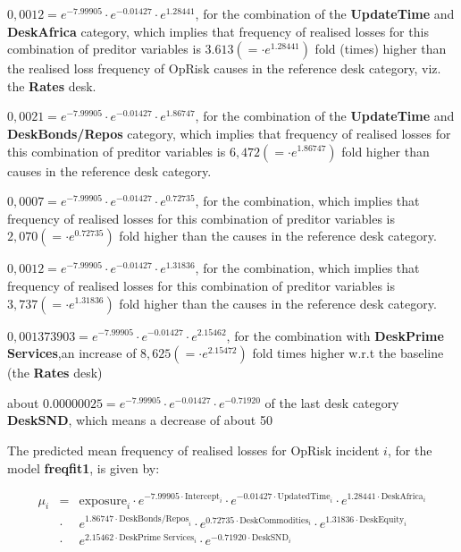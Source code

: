 \documentclass[]{article}
\begin{document}
\begin{list}{*}{}
\item $0,0012 = e^{-7.99905}\cdot e^{-0.01427}\cdot e^{1.28441}$, for the combination of the \textbf{UpdateTime} and \textbf{DeskAfrica} category, which implies that frequency of realised losses for this combination of preditor variables is $3.613 (=\cdot e^{1.28441})$ fold (times) higher than the realised loss frequency of OpRisk causes in the reference desk category, viz. the \textbf{Rates} desk. 
\item $0,0021 = e^{-7.99905}\cdot e^{-0.01427}\cdot e^{1.86747}$, for the combination of the \textbf{UpdateTime} and \textbf{DeskBonds/Repos} category, which implies that frequency of realised losses for this combination of preditor variables is $6,472(=\cdot e^{1.86747})$ fold higher than causes in the reference desk category.
\item $0,0007 = e^{-7.99905}\cdot e^{-0.01427}\cdot e^{0.72735}$, for the combination, which implies that frequency of realised losses for this combination of preditor variables is $2,070(=\cdot e^{0.72735})$ fold higher than the causes in the reference desk category.
\item $0,0012 = e^{-7.99905}\cdot e^{-0.01427}\cdot e^{1.31836}$, for the combination, which implies that frequency of realised losses for this combination of preditor variables is $3,737(=\cdot e^{1.31836})$ fold higher than the causes in the reference desk category.
\item $0,001373903 = e^{-7.99905}\cdot e^{-0.01427}\cdot e^{2.15462}$, for the combination with \textbf{DeskPrime Services},an increase of $8,625(=\cdot e^{2.15472})$ fold times higher w.r.t the baseline (the \textbf{Rates} desk)
\item about $0.00000025 = e^{-7.99905}\cdot e^{-0.01427}\cdot e^{-0.71920}$ of the last desk category \textbf{DeskSND}, which means a decrease of about 50%
\end{list}

The predicted mean frequency of realised losses for OpRisk incident
\(i\), for the model \textbf{freqfit1}, is given by:

\singlespacing

\begin{eqnarray}
\mu_{i}& = &\mbox{exposure}_i\cdot e^{-7.99905\cdot \mbox{Intercept}_i}\cdot e^{-0.01427\cdot \mbox{UpdatedTime}_i}\cdot e^{1.28441\cdot \mbox{DeskAfrica}_i}\nonumber\\
&\cdot&e^{1.86747\cdot \mbox{DeskBonds/Repos}_i}\cdot e^{0.72735\cdot \mbox{DeskCommodities}_i}\cdot e^{1.31836\cdot \mbox{DeskEquity}_i}\nonumber\\
&\cdot& e^{2.15462\cdot \mbox{DeskPrime Services}_i}\cdot e^{-0.71920\cdot \mbox{DeskSND}_i}
\end{eqnarray} \doublespacing
\end{document}
